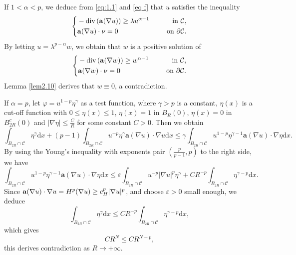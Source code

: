 \documentclass[12pt]{amsart}
\theoremstyle{definition}
\theoremstyle{remark}
\theoremstyle{conclusion}
\theoremstyle{conjecture}
\numberwithin{equation}{section}
\begin{document}
If $1<\alpha< p$, we deduce from \eqref{eq:1.1} and \eqref{eq f} that $u$ satisfies the inequality
\begin{equation*}
  \left\{
      \begin{aligned}
      &-\operatorname{div}\left({\bf{a}}(\nabla u)\right)\geq\lambda u^{\alpha-1} \quad\,\,\, &{\rm{in}} \,\, \mathcal{C}, \\
      &{\bf{a}}(\nabla u)\cdot \nu =0 \quad\,\,\, &{\rm{on}} \,\, \partial\mathcal{C}.
      \end{aligned}
      \right.
\end{equation*}
By letting $u=\lambda^{p-\alpha}w$, we obtain that $w$ is a positive solution of
\begin{equation*}
  \left\{
      \begin{aligned}
      &-\operatorname{div}\left({\bf{a}}(\nabla w)\right)\geq w^{\alpha-1} \quad\,\,\, &{\rm{in}} \,\, \mathcal{C}, \\
      &{\bf{a}}(\nabla w)\cdot \nu =0 \quad\,\,\, &{\rm{on}} \,\, \partial\mathcal{C}.
      \end{aligned}
      \right.
\end{equation*}
Lemma \ref{lem2.10} derives that $w\equiv0$, a contradiction.

If $\alpha=p$, let $\varphi=u^{1-p}\eta^{\gamma}$ as a test function, where $\gamma>p$ is a constant, $\eta(x)$ is a cut-off function with $0\leq\eta(x)\leq1$, $\eta(x)=1$ in $B_R(0)$, $\eta(x)=0$ in $B^c_{2R}(0)$ and $|\nabla\eta|\leq\frac{C}{R}$ for some constant $C>0$. Then we obtain
\begin{equation*}
  \int_{B_{2R}\cap\mathcal{C}}\eta^{\gamma}\mathrm{d}x+(p-1)\int_{B_{2R}\cap\mathcal{C}}u^{-p}\eta^{\gamma}{\mathbf{a}}(\nabla u)\cdot\nabla u\mathrm{d}x\leq\gamma\int_{B_{2R}\cap\mathcal{C}}u^{1-p}\eta^{\gamma-1}{\mathbf{a}}(\nabla u)\cdot\nabla \eta\mathrm{d}x.
\end{equation*}
By using the Young's inequality with exponents pair $(\frac{p}{p-1},p)$ to the right side, we have
$$\int_{B_{2R}\cap\mathcal{C}}u^{1-p}\eta^{\gamma-1}{\mathbf{a}}(\nabla u)\cdot\nabla \eta\mathrm{d}x\leq \varepsilon\int_{B_{2R}\cap\mathcal{C}}u^{-p}|\nabla u|^p\eta^{\gamma}+CR^{-p}\int_{B_{2R}\cap\mathcal{C}}\eta^{\gamma-p}\mathrm{d}x.$$
Since ${\bf{a}}(\nabla u)\cdot\nabla u=H^p(\nabla u)\geq c_{H}^p|\nabla u|^p$, and choose $\varepsilon>0$ small enough, we deduce
$$\int_{B_{2R}\cap\mathcal{C}}\eta^{\gamma}\mathrm{d}x\leq CR^{-p}\int_{B_{2R}\cap\mathcal{C}}\eta^{\gamma-p}\mathrm{d}x,$$
which gives
$$CR^N\leq CR^{N-p},$$
this derives contradiction as $R\rightarrow+\infty$.
\end{document}
